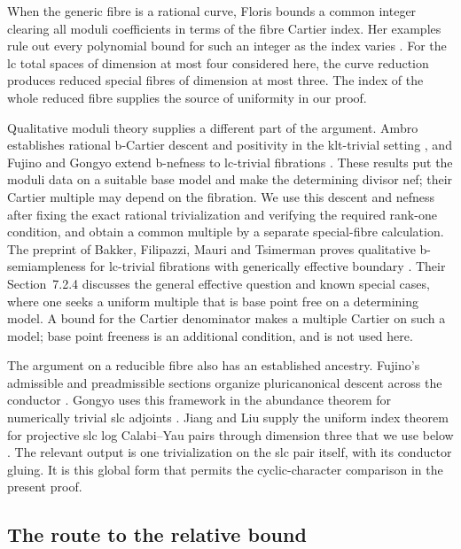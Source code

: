 When the generic fibre is a rational curve, Floris bounds a common integer
clearing all moduli coefficients in terms of the fibre Cartier index.  Her
examples rule out every polynomial bound for such an integer as the index
varies \cite[Theorem~1.6]{Floris2013}.  For the lc
total spaces of dimension at most four considered here, the curve
reduction produces reduced special fibres of dimension at most three.
The index of the whole reduced fibre supplies the source of uniformity
in our proof.

Qualitative moduli theory supplies a different part of the argument.
Ambro establishes rational b-Cartier descent and positivity in the
klt-trivial setting \cite{AmbroBoundary2004,AmbroModuli2005}, and Fujino
and Gongyo extend b-nefness to lc-trivial fibrations
\cite[Theorem~3.6]{FujinoGongyoModuli}.  These results put the moduli data
on a suitable base model and make the determining divisor nef; their
Cartier multiple may depend on the fibration.  We use this descent and
nefness after fixing the exact rational trivialization and verifying the
required rank-one condition, and obtain a common multiple by a separate
special-fibre calculation.  The preprint
of Bakker, Filipazzi, Mauri and Tsimerman proves qualitative
b-semiampleness for lc-trivial fibrations with generically effective
boundary \cite[Theorem~1.5]{BakkerFilipazziMauriTsimerman2025}.  Their
Section~7.2.4 discusses the general effective question and known special
cases, where one seeks a uniform multiple that is base point free on a
determining model.  A bound for the Cartier denominator makes a multiple
Cartier on such a model; base point freeness is an additional
condition, and is not used here.

The argument on a reducible fibre also has an established ancestry.
Fujino's admissible and preadmissible sections organize pluricanonical
descent across the conductor
\cite[Definition~4.1 and Lemma~4.2]{Fujino2000}.  Gongyo uses this
framework in the abundance theorem for numerically trivial slc adjoints
\cite[Theorem~1.5 and Section~5]{Gongyo2013}.  Jiang and Liu supply the
uniform index theorem for projective slc log Calabi--Yau pairs through
dimension three that we use below
\cite[Corollary~1.6, arXiv version~1]{JiangLiu2021}.  The relevant output
is one trivialization on the slc pair itself, with its conductor gluing.
It is this global form that permits the cyclic-character comparison in
the present proof.

\subsection{The route to the relative bound}

